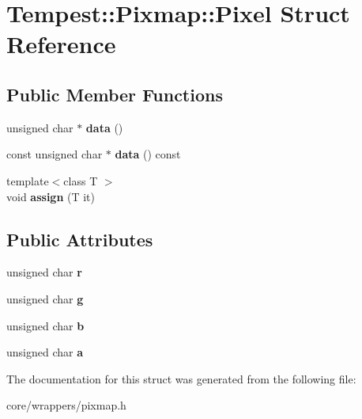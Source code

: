 \hypertarget{struct_tempest_1_1_pixmap_1_1_pixel}{\section{Tempest\+:\+:Pixmap\+:\+:Pixel Struct Reference}
\label{struct_tempest_1_1_pixmap_1_1_pixel}
}
\subsection*{Public Member Functions}
\begin{DoxyCompactItemize}
\item 
\hypertarget{struct_tempest_1_1_pixmap_1_1_pixel_add033d88aebd7318ccf6bcf531dd4f15}{unsigned char $\ast$ {\bfseries data} ()}\label{struct_tempest_1_1_pixmap_1_1_pixel_add033d88aebd7318ccf6bcf531dd4f15}

\item 
\hypertarget{struct_tempest_1_1_pixmap_1_1_pixel_af4132d11ccabe88f0a405d9b3f8d20c8}{const unsigned char $\ast$ {\bfseries data} () const }\label{struct_tempest_1_1_pixmap_1_1_pixel_af4132d11ccabe88f0a405d9b3f8d20c8}

\item 
\hypertarget{struct_tempest_1_1_pixmap_1_1_pixel_a7c5eb2499d14d0bdf096a9ce93dc9a06}{{\footnotesize template$<$class T $>$ }\\void {\bfseries assign} (T it)}\label{struct_tempest_1_1_pixmap_1_1_pixel_a7c5eb2499d14d0bdf096a9ce93dc9a06}

\end{DoxyCompactItemize}
\subsection*{Public Attributes}
\begin{DoxyCompactItemize}
\item 
\hypertarget{struct_tempest_1_1_pixmap_1_1_pixel_a5d3adcd71ace8b04408ad8b724a5b723}{unsigned char {\bfseries r}}\label{struct_tempest_1_1_pixmap_1_1_pixel_a5d3adcd71ace8b04408ad8b724a5b723}

\item 
\hypertarget{struct_tempest_1_1_pixmap_1_1_pixel_a89bf26c917c3f7b4478b354c9cecbc04}{unsigned char {\bfseries g}}\label{struct_tempest_1_1_pixmap_1_1_pixel_a89bf26c917c3f7b4478b354c9cecbc04}

\item 
\hypertarget{struct_tempest_1_1_pixmap_1_1_pixel_aedad6b6d306cf608f9a4dfeae7025033}{unsigned char {\bfseries b}}\label{struct_tempest_1_1_pixmap_1_1_pixel_aedad6b6d306cf608f9a4dfeae7025033}

\item 
\hypertarget{struct_tempest_1_1_pixmap_1_1_pixel_a9ecc23e81e98249771c87243db138d26}{unsigned char {\bfseries a}}\label{struct_tempest_1_1_pixmap_1_1_pixel_a9ecc23e81e98249771c87243db138d26}

\end{DoxyCompactItemize}


The documentation for this struct was generated from the following file\+:\begin{DoxyCompactItemize}
\item 
core/wrappers/pixmap.\+h\end{DoxyCompactItemize}

